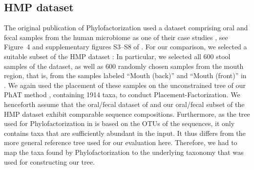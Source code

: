 
\subsection{HMP dataset}
\label{ch:Factorization:sec:Evaluation:sub:HMPDataset}

The original publication of Phylofactorization used a dataset comprising oral and fecal samples from the human microbiome
as one of their case studies \cite{Caporaso2011}, see Figure~4 and supplementary figures S3--S8 of \cite{Washburne2017a}.
For our comparison, we selected a suitable subset of the \ac{HMP} dataset \cite{Huttenhower2012,Methe2012}:
In particular, we selected all \num{600} stool samples of the dataset,
as well as \num{600} randomly chosen samples from the mouth region,
that is, from the samples labeled ``Mouth (back)'' and ``Mouth (front)'' in .
We again used the placement of these samples on the unconstrained  tree
of our \acf{PhAT} method \cite{Czech2018}, containing \num{1 914} taxa, to conduct Placement-Factorization.
We henceforth assume that the oral/fecal dataset of \cite{Caporaso2011}
and our oral/fecal subset of the \ac{HMP} dataset exhibit comparable sequence compositions.
Furthermore, as the tree used for Phylofactorization in \cite{Washburne2017a} is based on the OTUs of the sequences,
it only contains taxa that are sufficiently abundant in the input.
It thus differs from the more general reference tree used for our evaluation here.
Therefore, we had to map the taxa found by Phylofactorization
to the underlying  taxonomy \cite{Quast2013,Yilmaz2014} that was used for constructing our tree.

